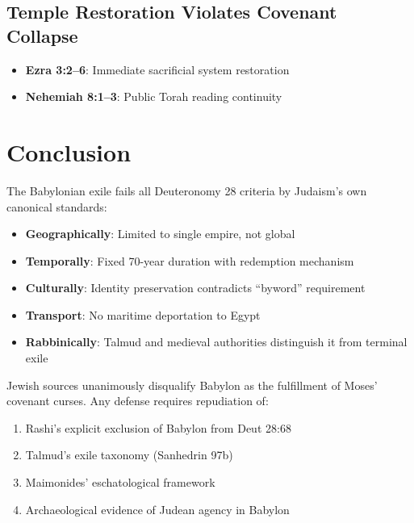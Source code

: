 \documentclass[12pt]{article}
\begin{document}
\subsection{Temple Restoration Violates Covenant Collapse}
\begin{itemize}
    \item \textbf{Ezra 3:2–6}: Immediate sacrificial system restoration
    \item \textbf{Nehemiah 8:1–3}: Public Torah reading continuity
\end{itemize}

\section{Conclusion}
The Babylonian exile fails all Deuteronomy 28 criteria by Judaism's own canonical standards:
\begin{itemize}
    \item \textbf{Geographically}: Limited to single empire, not global
    \item \textbf{Temporally}: Fixed 70-year duration with redemption mechanism
    \item \textbf{Culturally}: Identity preservation contradicts “byword” requirement
    \item \textbf{Transport}: No maritime deportation to Egypt
    \item \textbf{Rabbinically}: Talmud and medieval authorities distinguish it from terminal exile
\end{itemize}

Jewish sources unanimously disqualify Babylon as the fulfillment of Moses' covenant curses. Any defense requires repudiation of:
\begin{enumerate}
    \item Rashi's explicit exclusion of Babylon from Deut 28:68
    \item Talmud's exile taxonomy (Sanhedrin 97b)
    \item Maimonides' eschatological framework
    \item Archaeological evidence of Judean agency in Babylon
\end{enumerate}
\end{document}
